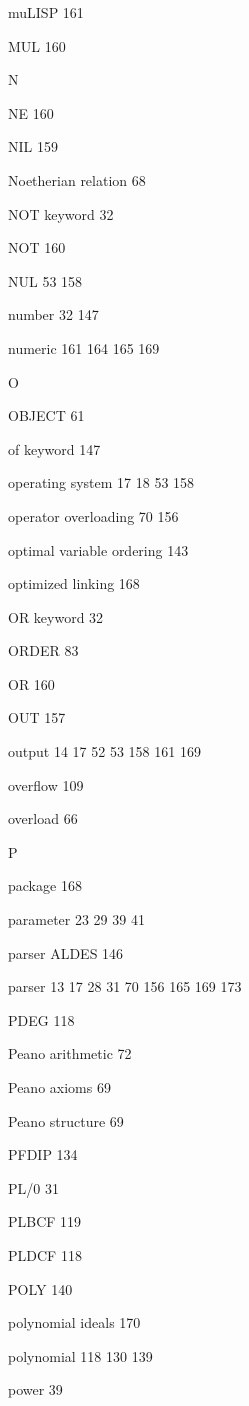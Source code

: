 \item muLISP 161
\item MUL 160
\indexspace
\item {\Large N}
\item NE 160
\item NIL 159
\item Noetherian relation 68
\item NOT keyword 32
\item NOT 160
\item NUL  53 158
\item number   32  147
\item numeric  161 164 165 169
\indexspace
\item {\Large O}
\item OBJECT 61
\item of keyword 147
\item operating system  17 18 53 158
\item operator overloading  70 156
\item optimal variable ordering 143
\item optimized linking 168
\item OR keyword 32
\item ORDER 83
\item OR 160
\item OUT 157
\item output  14 17 52 53 158 161 169
\item overflow 109
\item overload 66
\indexspace
\item {\Large P}
\item package 168
\item parameter  23 29 39 41
\item parser ALDES 146
\item parser  13 17 28 31 70 156 165 169 173
\item PDEG 118
\item Peano arithmetic 72
\item Peano axioms 69
\item Peano structure 69
\item PFDIP 134
\item PL/0 31
\item PLBCF 119
\item PLDCF 118
\item POLY 140
\item polynomial ideals 170
\item polynomial  118 130 139
\item power 39

